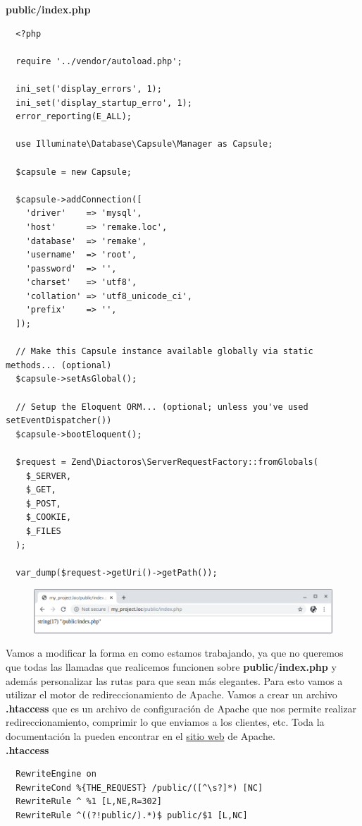 \documentclass{article}
\begin{document}
\textbf{public/index.php}
\begin{verbatim}
  <?php

  require '../vendor/autoload.php';

  ini_set('display_errors', 1);
  ini_set('display_startup_erro', 1);
  error_reporting(E_ALL);

  use Illuminate\Database\Capsule\Manager as Capsule;

  $capsule = new Capsule;

  $capsule->addConnection([
    'driver'    => 'mysql',
    'host'      => 'remake.loc',
    'database'  => 'remake',
    'username'  => 'root',
    'password'  => '',
    'charset'   => 'utf8',
    'collation' => 'utf8_unicode_ci',
    'prefix'    => '',
  ]);

  // Make this Capsule instance available globally via static methods... (optional)
  $capsule->setAsGlobal();

  // Setup the Eloquent ORM... (optional; unless you've used setEventDispatcher())
  $capsule->bootEloquent();

  $request = Zend\Diactoros\ServerRequestFactory::fromGlobals(
    $_SERVER,
    $_GET,
    $_POST,
    $_COOKIE,
    $_FILES
  );

  var_dump($request->getUri()->getPath());
\end{verbatim}

\begin{figure}[h!]
  \centering
  \includegraphics[scale=0.5]{./Pictures/113_diactoros_vardump.png}
\end{figure}

Vamos a modificar la forma en como estamos trabajando, ya que no queremos que
todas las llamadas que realicemos funcionen sobre \textbf{public/index.php}
y además personalizar las rutas para que sean más elegantes.  Para esto vamos a
utilizar el motor de redireccionamiento de Apache. Vamos a crear un archivo
\textbf{.htaccess} que es un archivo de configuración de Apache que nos permite
realizar redireccionamiento, comprimir lo que enviamos a los clientes, etc.
Toda la documentación la pueden encontrar en el
\href{https://httpd.apache.org/docs/current/es/howto/htaccess.html}{sitio web}
de Apache.\\

\textbf{.htaccess}
\begin{verbatim}
  RewriteEngine on
  RewriteCond %{THE_REQUEST} /public/([^\s?]*) [NC]
  RewriteRule ^ %1 [L,NE,R=302]
  RewriteRule ^((?!public/).*)$ public/$1 [L,NC]
\end{verbatim}
\end{document}
